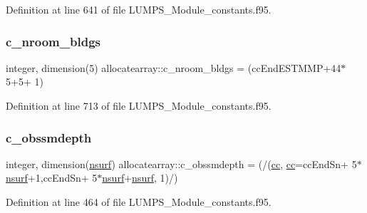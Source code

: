 Definition at line 641 of file L\+U\+M\+P\+S\+\_\+\+Module\+\_\+constants.\+f95.

\mbox{\label{namespaceallocatearray_ab1dd7a48c1507d9047274aaa6099894a}} 
\subsubsection{\texorpdfstring{c\+\_\+nroom\+\_\+bldgs}{c\_nroom\_bldgs}}
{\footnotesize\ttfamily integer, dimension(5) allocatearray\+::c\+\_\+nroom\+\_\+bldgs = (cc\+End\+E\+S\+T\+M\+MP+44$\ast$5+5+ 1)}



Definition at line 713 of file L\+U\+M\+P\+S\+\_\+\+Module\+\_\+constants.\+f95.

\mbox{\label{namespaceallocatearray_a9b49ada474982a9b6ff4af05c6541e16}} 
\subsubsection{\texorpdfstring{c\+\_\+obssmdepth}{c\_obssmdepth}}
{\footnotesize\ttfamily integer, dimension(\hyperlink{namespaceallocatearray_acd22f92a06f7e9a2a91426b3dc99fdb0}{nsurf}) allocatearray\+::c\+\_\+obssmdepth = (/(\hyperlink{namespaceallocatearray_ac863c81704eb507dee10f5e10741e10c}{cc}, \hyperlink{namespaceallocatearray_ac863c81704eb507dee10f5e10741e10c}{cc}=cc\+End\+Sn+ 5$\ast$\hyperlink{namespaceallocatearray_acd22f92a06f7e9a2a91426b3dc99fdb0}{nsurf}+1,cc\+End\+Sn+ 5$\ast$\hyperlink{namespaceallocatearray_acd22f92a06f7e9a2a91426b3dc99fdb0}{nsurf}+\hyperlink{namespaceallocatearray_acd22f92a06f7e9a2a91426b3dc99fdb0}{nsurf}, 1)/)}



Definition at line 464 of file L\+U\+M\+P\+S\+\_\+\+Module\+\_\+constants.\+f95.

\mbox{\label{namespaceallocatearray_a4bd2ca130f4137bcec05fc943934d533}} 
